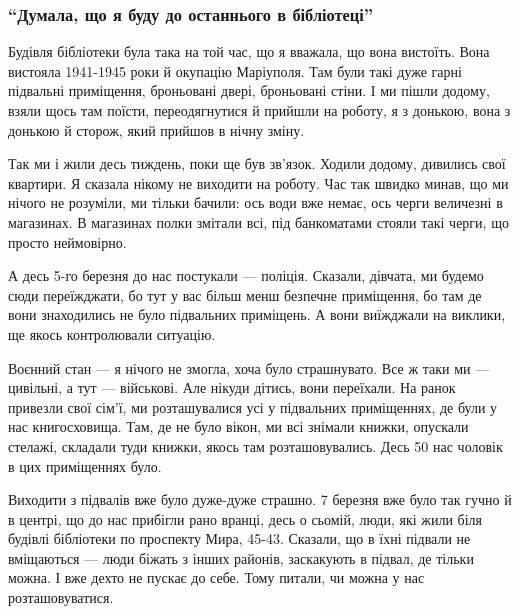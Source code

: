  
 
 
 
 

\subsubsection{\enquote{Думала, що я буду до останнього в бібліотеці}}

Будівля бібліотеки була така на той час, що я вважала, що вона вистоїть. Вона
вистояла 1941-1945 роки й окупацію Маріуполя. Там були такі дуже гарні
підвальні приміщення, броньовані двері, броньовані стіни. І ми пішли додому,
взяли щось там поїсти, переодягнутися й прийшли на роботу, я з донькою, вона з
донькою й сторож, який прийшов в нічну зміну.

Так ми і жили десь тиждень, поки ще був зв'язок. Ходили додому, дивились свої
квартири. Я сказала нікому не виходити на роботу. Час так швидко минав, що ми
нічого не розуміли, ми тільки бачили: ось води вже немає, ось черги величезні в
магазинах. В магазинах полки змітали всі, під банкоматами стояли такі черги, що
просто неймовірно. 


А десь 5-го березня до нас постукали — поліція. Сказали, дівчата, ми будемо
сюди переїжджати, бо тут у вас більш менш безпечне приміщення, бо там де вони
знаходились не було підвальних приміщень. А вони виїжджали на виклики, ще якось
контролювали ситуацію.

Воєнний стан — я нічого не змогла, хоча було страшнувато. Все ж таки ми —
цивільні, а тут — військові. Але нікуди дітись, вони переїхали. На ранок
привезли свої сім'ї, ми розташувалися усі у підвальних приміщеннях, де були у
нас книгосховища. Там, де не було вікон, ми всі знімали книжки, опускали
стелажі, складали туди книжки, якось там розташовувались. Десь 50 нас чоловік в
цих приміщеннях було.

Виходити з підвалів вже було дуже-дуже страшно. 7 березня вже було так гучно й
в центрі, що до нас прибігли рано вранці, десь о сьомій, люди, які жили біля
будівлі бібліотеки по проспекту Мира, 45-43. Сказали, що в їхні підвали не
вміщаються — люди біжать з інших районів, заскакують в підвал, де тільки можна.
І вже дехто не пускає до себе. Тому питали, чи можна у нас розташовуватися.

